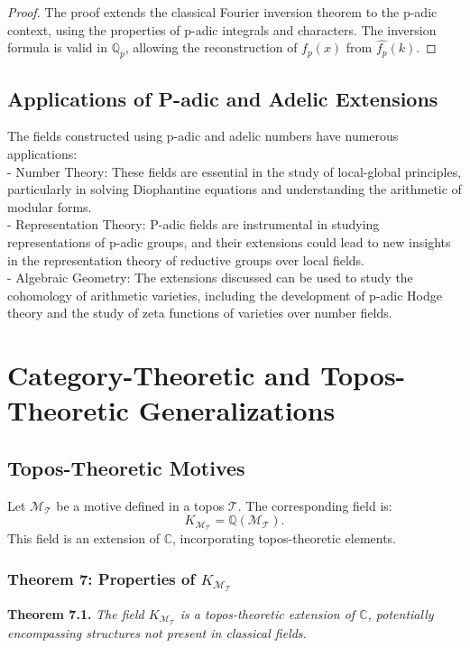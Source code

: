 \documentclass{article}
\begin{document}
\begin{proof}
The proof extends the classical Fourier inversion theorem to the p-adic context, using the properties of p-adic integrals and characters. The inversion formula is valid in \(\mathbb{Q}_p\), allowing the reconstruction of \(f_p(x)\) from \(\widehat{f_p}(k)\).
\end{proof}

\subsection{Applications of P-adic and Adelic Extensions}
The fields constructed using p-adic and adelic numbers have numerous applications:
{\ }\\
- Number Theory: These fields are essential in the study of local-global principles, particularly in solving Diophantine equations and understanding the arithmetic of modular forms.
{\ }\\
- Representation Theory: P-adic fields are instrumental in studying representations of p-adic groups, and their extensions could lead to new insights in the representation theory of reductive groups over local fields.
{\ }\\
- Algebraic Geometry: The extensions discussed can be used to study the cohomology of arithmetic varieties, including the development of p-adic Hodge theory and the study of zeta functions of varieties over number fields.

\section{Category-Theoretic and Topos-Theoretic Generalizations}
\subsection{Topos-Theoretic Motives}
Let \(\mathcal{M}_{\mathcal{T}}\) be a motive defined in a topos \(\mathcal{T}\). The corresponding field is:
\[
K_{\mathcal{M}_{\mathcal{T}}} = \mathbb{Q}(\mathcal{M}_{\mathcal{T}}).
\]
This field is an extension of \(\mathbb{C}\), incorporating topos-theoretic elements.

\subsubsection{Theorem 7: Properties of \(K_{\mathcal{M}_{\mathcal{T}}}\)}
\textbf{Theorem 7.1.} \textit{The field \(K_{\mathcal{M}_{\mathcal{T}}}\) is a topos-theoretic extension of \(\mathbb{C}\), potentially encompassing structures not present in classical fields.}
\end{document}
